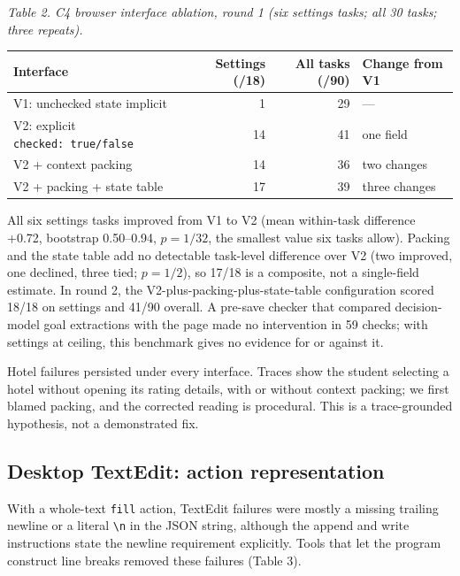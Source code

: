 \documentclass[
  10pt,
]{article}
\newcounter{none} %
\begin{document}
\emph{Table 2. C4 browser interface ablation, round 1 (six settings
tasks; all 30 tasks; three repeats).}

{\def\LTcaptype{none} %
\begin{longtable}[]{@{}lrrl@{}}
\toprule\noalign{}
Interface & Settings (/18) & All tasks (/90) & Change from V1 \\
\midrule\noalign{}
\endhead
\bottomrule\noalign{}
\endlastfoot
V1: unchecked state implicit & 1 & 29 & --- \\
V2: explicit \texttt{checked:\ true/false} & 14 & 41 & one field \\
V2 + context packing & 14 & 36 & two changes \\
V2 + packing + state table & 17 & 39 & three changes \\
\end{longtable}
}

All six settings tasks improved from V1 to V2 (mean within-task
difference +0.72, bootstrap 0.50--0.94, \(p=1/32\), the smallest value
six tasks allow). Packing and the state table add no detectable
task-level difference over V2 (two improved, one declined, three tied;
\(p=1/2\)), so 17/18 is a composite, not a single-field estimate. In
round 2, the V2-plus-packing-plus-state-table configuration scored 18/18
on settings and 41/90 overall. A pre-save checker that compared
decision-model goal extractions with the page made no intervention in 59
checks; with settings at ceiling, this benchmark gives no evidence for
or against it.

Hotel failures persisted under every interface. Traces show the student
selecting a hotel without opening its rating details, with or without
context packing; we first blamed packing, and the corrected reading is
procedural. This is a trace-grounded hypothesis, not a demonstrated fix.

\subsection{Desktop TextEdit: action
representation}\label{desktop-textedit-action-representation}

With a whole-text \texttt{fill} action, TextEdit failures were mostly a
missing trailing newline or a literal \texttt{\textbackslash{}n} in the
JSON string, although the append and write instructions state the
newline requirement explicitly. Tools that let the program construct
line breaks removed these failures (Table 3).
\end{document}
